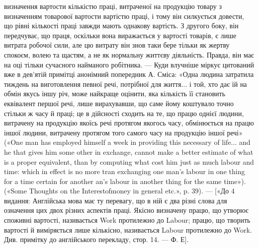 визначення вартости кількістю праці, витраченої на продукцію товару
з визначенням товарової вартости вартістю праці, і тому він силкується
довести, що рівні кількості праці завжди мають однакову вартість. З другого
боку, він передчуває, що праця, оскільки вона виражається у вартості
товарів, є лише витрата робочої сили, але цю витрату він знов таки
бере тільки як жертву спокоєм, волею та щастям, а не як нормальну життєву
діяльність. Правда, він має на оці тільки сучасного найманого робітника.
— Куди влучніше міркує цитований вже в дев’ятій примітці анонімний
попередник А. Сміса: «Одна людина затратила тиждень на виготовлення
певної речі, потрібної для життя... і той, хто дає їй на обмін якусь
іншу річ, може найкраще оцінити, яка кількість її становить еквівалент
першої речі, лише вирахувавши, що саме йому коштувало точно стільки ж
часу й праці; це в дійсності сходить на те, що працю однієї людини, витрачену
на продукцію якоїсь речі протягом якогось часу, обмінюється
на працю іншої людини, витрачену протягом того самого часу на продукцію
іншої речі» («One man has employed himself a week in providing this
necessary of life... and he that gives him some other in exchange, cannot
make a better estimate of what is a proper equivalent, than by computing what
cost him just as much labour and time: which in effect is no more tran exchanging
one man’s labour in one thing for a time certain for another an’s labour
in another thing for the same time»). («Some Thoughts on the Interestofmoney
in general etc.», p. 39). — [«До 4 видання: Англійська мова має
ту перевагу, що в ній є два різні слова для означення цих двох різних аспектів
праці. Якісно визначену працю, що утворює споживні вартості,
називається Work протилежно до Labour; працю, що творить вартості
й виміряється лише кількісно, називається Labour протилежно до Work.
Див. примітку до англійського перекладу, стор. 14. — Ф. Е].
\parbreak{}  %

